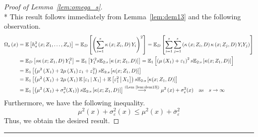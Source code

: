 \begin{proof}[Proof of Lemma~\ref{lem:omega_s}]\mbox{}\\*
    This result follows immediately from Lemma~\ref{lem:dem13} and the following observation.
	\begin{equation}
		\begin{aligned}
			\Omega_{s}\left(x\right)
			 & = \mathbb{E}\left[h_{s}^{2}\left(x; Z_1, \ldots,  Z_{s}\right)\right]
			= \mathbb{E}_{D}\left[\left(\sum_{i = 1}^{s}\kappa\left(x; Z_{i}, D\right)Y_{i}\right)^2\right]
			= \mathbb{E}_{D}\left[\sum_{i = 1}^{s}\sum_{j = 1}^{s}\left(\kappa\left(x; Z_{i}, D\right)\kappa\left(x; Z_{j}, D\right)Y_{i}Y_{j}\right)\right] \\
			 & = \mathbb{E}_{D}\left[s \kappa\left(x; Z_{1}, D\right)Y_{1}^2\right]
			= \mathbb{E}_{1}\left[Y_{1}^2 s \mathbb{E}_{2:s}\left[\kappa\left(x; Z_{1}, D\right)\right]\right]       
            = \mathbb{E}_{1}\left[\left(\mu\left(X_1\right) + \varepsilon_1\right)^2 s \mathbb{E}_{2:s}\left[\kappa(x; Z_1, D)\right]\right] \\
			 & = \mathbb{E}_{1}\left[\left(\mu^2\left(X_1\right) + 2\mu\left(X_1\right)\varepsilon_1 + \varepsilon_1^2\right)s \mathbb{E}_{2:s}\left[\kappa(x; Z_1, D)\right]\right]                       \\
			 & = \mathbb{E}_{1}\left[\left(\mu^2\left(X_1\right) + 2\mu\left(X_1\right) \mathbb{E}\left[\varepsilon_1 \, \middle| \, X_1\right] + \mathbb{E}\left[\varepsilon_1^2 \, \middle| \, X_1\right]\right)
			s \mathbb{E}_{2:s}\left[\kappa(x; Z_1, D)\right]\right]                                                                                                                                \\
			 & = \mathbb{E}_{1}\left[\left(\mu^2\left(X_1\right) +\sigma_{\varepsilon}^{2}(X_1)\right) s \mathbb{E}_{2:s}\left[\kappa(x; Z_1, D)\right]\right]              \overset{\text{(Lem~\ref{lem:dem13})}}{\longrightarrow} \mu^2\left(x\right) +\sigma_{\varepsilon}^{2}(x)
			\quad \text{as} \quad s \rightarrow \infty
		\end{aligned}
	\end{equation}
    Furthermore, we have the following inequality.
    \begin{equation}
        \mu^2(x) + \sigma_{\varepsilon}^2(x) \leq \mu^2\left(x\right) + \overline{\sigma}_{\varepsilon}^{2}
    \end{equation}
	Thus, we obtain the desired result.
\end{proof}

\hrule

